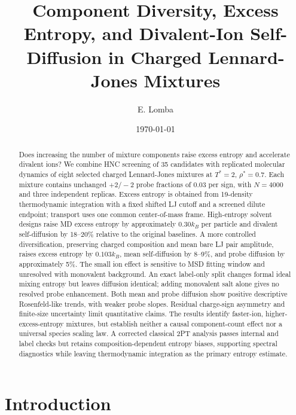 \documentclass[aps,pre,twocolumn,superscriptaddress,floatfix]{revtex4-2}
\begin{document}
\title{Component Diversity, Excess Entropy, and Divalent-Ion Self-Diffusion in Charged Lennard-Jones Mixtures}

\author{E. Lomba}

\date{\today}

\begin{abstract}
Does increasing the number of mixture components raise excess entropy and accelerate divalent ions? We combine HNC screening of 35 candidates with replicated molecular dynamics of eight selected charged Lennard-Jones mixtures at $T^*=2$, $\rho^*=0.7$. Each mixture contains unchanged $+2/-2$ probe fractions of 0.03 per sign, with $N=4000$ and three independent replicas. Excess entropy is obtained from 19-density thermodynamic integration with a fixed shifted LJ cutoff and a screened dilute endpoint; transport uses one common center-of-mass frame. High-entropy solvent designs raise MD excess entropy by approximately $0.30k_B$ per particle and divalent self-diffusion by 18--20\% relative to the original baselines. A more controlled diversification, preserving charged composition and mean bare LJ pair amplitude, raises excess entropy by $0.103k_B$, mean self-diffusion by 8--9\%, and probe diffusion by approximately 5\%. The small ion effect is sensitive to MSD fitting window and unresolved with monovalent background. An exact label-only split changes formal ideal mixing entropy but leaves diffusion identical; adding monovalent salt alone gives no resolved probe enhancement. Both mean and probe diffusion show positive descriptive Rosenfeld-like trends, with weaker probe slopes. Residual charge-sign asymmetry and finite-size uncertainty limit quantitative claims. The results identify faster-ion, higher-excess-entropy mixtures, but establish neither a causal component-count effect nor a universal species scaling law.
A corrected classical 2PT analysis passes internal and label checks but retains composition-dependent entropy biases, supporting spectral diagnostics while leaving thermodynamic integration as the primary entropy estimate.
\end{abstract}
\maketitle

\section{Introduction}
\end{document}
